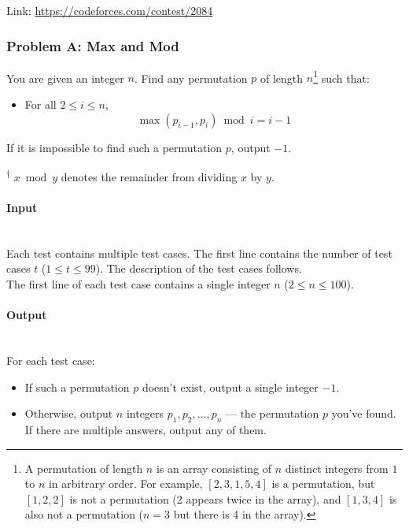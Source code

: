 \documentclass{article}
\begin{document}
Link: \url{https://codeforces.com/contest/2084}

\subsubsection{Problem A: Max and Mod}

You are given an integer $n$. Find any permutation $p$ of length $n$\footnote{A permutation of length $n$ is an array consisting of $n$ distinct integers from $1$ to $n$ in arbitrary order. For example, $[2,3,1,5,4]$ is a permutation, but $[1,2,2]$ is not a permutation (2 appears twice in the array), and $[1,3,4]$ is also not a permutation ($n = 3$ but there is 4 in the array).} such that:

\begin{itemize}
    \item For all $2 \le i \le n$, 
    \[
        \max(p_{i-1}, p_i) \bmod i = i - 1
    \]
\end{itemize}

If it is impossible to find such a permutation $p$, output $-1$.

\textsuperscript{$\dagger$} $x \bmod y$ denotes the remainder from dividing $x$ by $y$.


\paragraph{Input} \mbox{} \\

Each test contains multiple test cases. The first line contains the number of test cases $t$ ($1 \le t \le 99$). The description of the test cases follows.\\

The first line of each test case contains a single integer $n$ ($2 \le n \le 100$).

\paragraph{Output}\mbox{} \\

For each test case:

\begin{itemize}
    \item If such a permutation $p$ doesn't exist, output a single integer $-1$.
    \item Otherwise, output $n$ integers $p_1, p_2, \ldots, p_n$ — the permutation $p$ you’ve found. If there are multiple answers, output any of them.
\end{itemize}
\end{document}
